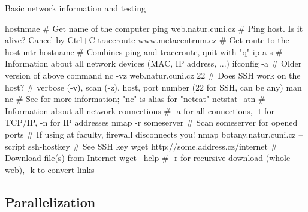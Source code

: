 \documentclass[hyperref={bookmarks=true, unicode=true, colorlinks=true, pdftitle={Linux, command line and MetaCentrum}, plainpages=false, pdfauthor={Vojtech Zeisek}, pdfsubject={Course about use of Linux command line, writing shell scripts and using MetaCentrum of CESNET}, pdfcreator={XeLaTeX, http://www.xelatex.org/}, pdfkeywords={Linux, GNU, BASH, shell, command line, MetaCentrum}, linkcolor=Sienna, anchorcolor=black, citecolor=green, filecolor=magenta, menucolor=Sienna, urlcolor=cyan, pdftex}, compress, ucs, xelatex, xcolor=svgnames, 11pt]{beamer}
\begin{document}
\begin{frame}[fragile]{Basic network information and testing}
  \begin{bashcode}
    hostnmae # Get name of the computer
    ping web.natur.cuni.cz # Ping host. Is it alive? Cancel by Ctrl+C
    traceroute www.metacentrum.cz # Get route to the host
    mtr hostname # Combines ping and traceroute, quit with "q"
    ip a s # Information about all network devices (MAC, IP address, ...)
    ifconfig -a # Older version of above command
    nc -vz web.natur.cuni.cz 22 # Does SSH work on the host?
       # verbose (-v), scan (-z), host, port number (22 for SSH, can be any)
    man nc # See for more information; "nc" is alias for "netcat"
    netstat -atn # Information about all network connections
            # -a for all connections, -t for TCP/IP, -n for IP addresses
    nmap -r someserver # Scan someserver for opened ports
                       # If using at faculty, firewall disconnects you!
    nmap botany.natur.cuni.cz --script ssh-hostkey # See SSH key
    wget http://some.address.cz/internet # Download file(s) from Internet
    wget --help # -r for recursive download (whole web), -k to convert links
  \end{bashcode}
\end{frame}

\subsection{Parallelization}
\end{document}
